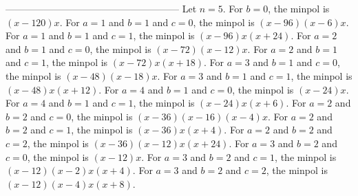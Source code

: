 \documentclass[numbers=enddot,12pt,final,onecolumn,notitlepage]{scrartcl}%
\numberwithin{exer}{subsection}
\theoremstyle{definition}
\begin{document}
------------------------------------------------------ \newline Let $n=5$.
\newline For $b=0$, the minpol is $(x-120)x$. \newline For $a=1$ and $b=1$ and
$c=0$, the minpol is $(x-96)(x-6)x$. \newline For $a=1$ and $b=1$ and $c=1$,
the minpol is $(x-96)x(x+24)$. \newline For $a=2$ and $b=1$ and $c=0$, the
minpol is $(x-72)(x-12)x$. \newline For $a=2$ and $b=1$ and $c=1$, the minpol
is $(x-72)x(x+18)$. \newline For $a=3$ and $b=1$ and $c=0$, the minpol is
$(x-48)(x-18)x$. \newline For $a=3$ and $b=1$ and $c=1$, the minpol is
$(x-48)x(x+12)$. \newline For $a=4$ and $b=1$ and $c=0$, the minpol is
$(x-24)x$. \newline For $a=4$ and $b=1$ and $c=1$, the minpol is
$(x-24)x(x+6)$. \newline For $a=2$ and $b=2$ and $c=0$, the minpol is
$(x-36)(x-16)(x-4)x$. \newline For $a=2$ and $b=2$ and $c=1$, the minpol is
$(x-36)x(x+4)$. \newline For $a=2$ and $b=2$ and $c=2$, the minpol is
$(x-36)(x-12)x(x+24)$. \newline For $a=3$ and $b=2$ and $c=0$, the minpol is
$(x-12)x$. \newline For $a=3$ and $b=2$ and $c=1$, the minpol is
$(x-12)(x-2)x(x+4)$. \newline For $a=3$ and $b=2$ and $c=2$, the minpol is
$(x-12)(x-4)x(x+8)$. \newline
\end{document}
